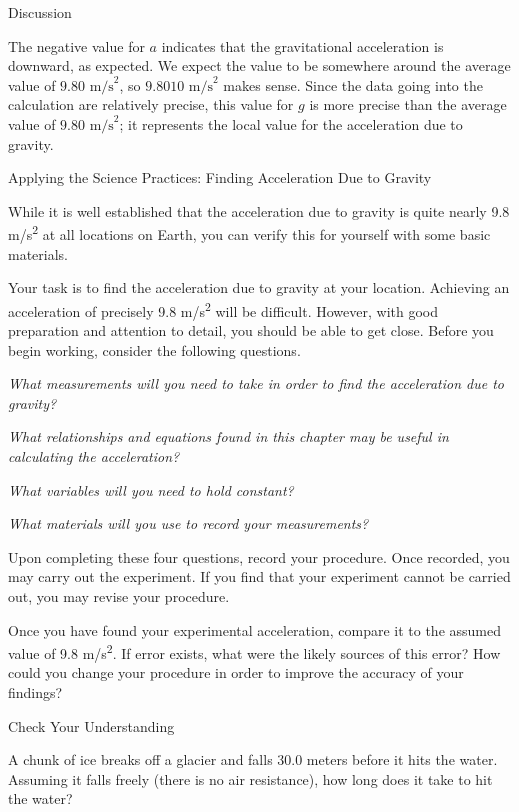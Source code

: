 \documentclass[
]{book}
\begin{document}
{Discussion}

The negative value for \(a{}\) indicates that the gravitational
acceleration is downward, as expected. We expect the value to be
somewhere around the average value of \({9\text{.}\text{80\ m/s}^{2}}{}\),
so \({9\text{.}\text{8010\ m/s}^{2}}{}\) makes sense. Since the data going
into the calculation are relatively precise, this value for \(g{}\) is
more precise than the average value of
\({9\text{.}\text{80\ m/s}^{2}}{}\); it represents the local value for the
acceleration due to gravity.

\hypertarget{fs-id2149869}{}
Applying the Science Practices: Finding Acceleration Due to Gravity

While it is well established that the acceleration due to gravity is
quite nearly 9.8 m/s\textsuperscript{2} at all locations on Earth, you can verify this
for yourself with some basic materials.

Your task is to find the acceleration due to gravity at your location.
Achieving an acceleration of precisely 9.8 m/s\textsuperscript{2} will be difficult.
However, with good preparation and attention to detail, you should be
able to get close. Before you begin working, consider the following
questions.

\emph{What measurements will you need to take in order to find the
acceleration due to gravity?}

\emph{What relationships and equations found in this chapter may be useful in
calculating the acceleration?}

\emph{What variables will you need to hold constant?}

\emph{What materials will you use to record your measurements?}

Upon completing these four questions, record your procedure. Once
recorded, you may carry out the experiment. If you find that your
experiment cannot be carried out, you may revise your procedure.

Once you have found your experimental acceleration, compare it to the
assumed value of 9.8 m/s\textsuperscript{2}. If error exists, what were the likely
sources of this error? How could you change your procedure in order to
improve the accuracy of your findings?

\hypertarget{fs-id4172780}{}
Check Your Understanding

\leavevmode{}%
A chunk of ice breaks off a glacier and falls 30.0 meters before it hits
the water. Assuming it falls freely (there is no air resistance), how
long does it take to hit the water?
\end{document}
